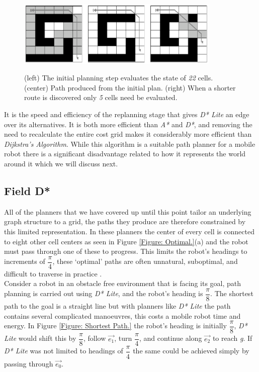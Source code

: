 \begin{figure}[htbp]

\center \includegraphics[width=275pt]{illustrations/d*_lite_path}\\
\caption{(left) The initial planning step evaluates the state of \textit{22} cells. (center) Path produced from the initial plan. (right) When a shorter route is discovered only \textit{5} cells need be evaluated.  \cite{HEURISTIC}}
\label{Figure: D* Lite Path.}

\end{figure}

\noindent
It is the speed and efficiency of the replanning stage that gives \textit{D* Lite} an edge over its alternatives. It is both more efficient than \textit{A*} and \textit{D*}, and removing the need to recalculate the entire cost grid makes it considerably more efficient than \textit{Dijkstra's Algorithm}. While this algorithm is a suitable path planner for a mobile robot there is a significant disadvantage related to how it represents the world around it which we will discuss next.

\newpage

\subsection{Field D*}
\noindent
All of the planners that we have covered up until this point tailor an underlying graph structure to a grid, the paths they produce are therefore constrained by this limited representation. In these planners the center of every cell is connected to eight other cell centers as seen in Figure \ref{Figure: Optimal.}(a) and the robot must pass through one of these to progress. This limits the robot's headings to increments of $\dfrac{\pi}{4}$, these `optimal' paths are often unnatural, suboptimal, and difficult to traverse in practice \cite{FIELD}.\\ 

\noindent
Consider a robot in an obstacle free environment that is facing its goal, path planning is carried out using \textit{D* Lite}, and the robot's heading is $\dfrac{\pi}{8}$. The shortest path to the goal is a straight line but with planners like \textit{D* Lite} the path contains several complicated manoeuvres, this costs a mobile robot time and energy. In Figure \ref{Figure: Shortest Path.} the robot's heading is initially $\dfrac{\pi}{8}$, \textit{D* Lite} would shift this by $\dfrac{\pi}{8}$, follow $\overrightarrow{e_{1}}$, turn $\dfrac{\pi}{4}$, and continue along $\overrightarrow{e_{2}}$ to reach \textit{g}. If \textit{D* Lite} was not limited to headings of $\dfrac{\pi}{4}$ the same could be achieved simply by passing through $\overrightarrow{e_{0}}$.

